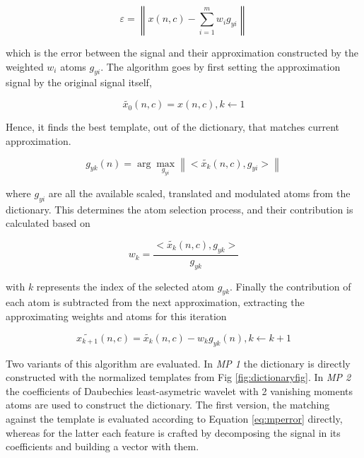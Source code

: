 \documentclass[brainsci,article,submit,moreauthors,pdftex,10pt,a4paper]{mdpi}
\begin{document}
\begin{equation}
\varepsilon =  \left\lVert   x(n,c) - \sum_{i=1}^{m} w_i g_{yi}   \right\rVert
\label{eq:mperror}
\end{equation}

which is the error between the signal and their approximation constructed by the weighted $w_i$ atoms $g_{yi}$.  The algorithm goes by first setting the approximation signal by the original signal itself,  

\begin{equation}
\tilde{x_{0}}(n,c) = x(n,c), k \leftarrow 1
\label{eq:multiclassificationrow}
\end{equation}

Hence, it finds the best template, out of the dictionary, that matches current approximation.  

\begin{equation}
g_{yk}(n) = \arg \max_{g_{yi}} \left\lVert < \tilde{x_{k}}(n,c), g_{yi} > \right\rVert 
\label{eq:multiclassificationrow}
\end{equation}

where $g_{yi}$ are all the available scaled, translated and modulated atoms from the dictionary.  This determines the atom selection process, and their contribution is calculated based on 

\begin{equation}
w_{k} =  \frac{< \tilde{x_{k}}(n,c), g_{yk} >}{g_{yk}}
\label{eq:multiclassificationrow}
\end{equation}

with $k$ represents the index of the selected atom $g_{yk}$.  Finally the contribution of each atom is subtracted from the next approximation,  extracting the approximating weights and atoms for this iteration \citep{Cohen2014,Sanei2007, Mallat1993}

\begin{equation}
\tilde{x_{k+1}}(n,c)=  \tilde{x_k}(n,c) - w_{k} g_{yk} (n), k \leftarrow k + 1
\label{eq:multiclassificationrow}
\end{equation}

Two variants of this algorithm are evaluated. In \textit{MP 1} the dictionary is directly constructed with the normalized templates from Fig \ref{fig:dictionaryfig}.  In \textit{MP 2} the coefficients of  Daubechies least-asymetric wavelet with 2 vanishing moments atoms are used to construct the dictionary.  The first version, the matching against the template is evaluated according to Equation \ref{eq:mperror} directly, whereas for the latter each feature is crafted by decomposing the signal in its coefficients and building a vector with them.
\end{document}
